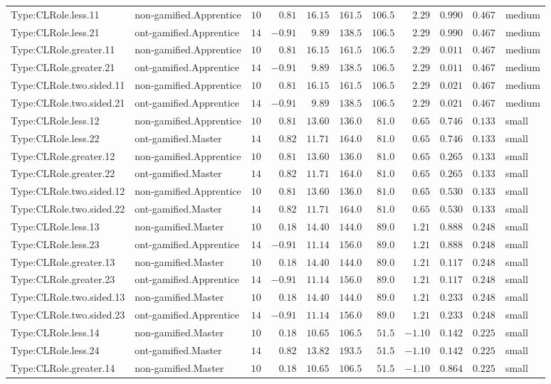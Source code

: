 \documentclass[6pt,a4paper]{article}
\begin{document}
{\begin{longtable}{llrrrrrrrrl}
Type:CLRole.less.11&non-gamified.Apprentice&$10$&$ 0.81$&$16.15$&$161.5$&$106.5$&$ 2.29$&$0.990$&$0.467$&medium\tabularnewline
Type:CLRole.less.21&ont-gamified.Apprentice&$14$&$-0.91$&$ 9.89$&$138.5$&$106.5$&$ 2.29$&$0.990$&$0.467$&medium\tabularnewline
Type:CLRole.greater.11&non-gamified.Apprentice&$10$&$ 0.81$&$16.15$&$161.5$&$106.5$&$ 2.29$&$0.011$&$0.467$&medium\tabularnewline
Type:CLRole.greater.21&ont-gamified.Apprentice&$14$&$-0.91$&$ 9.89$&$138.5$&$106.5$&$ 2.29$&$0.011$&$0.467$&medium\tabularnewline
Type:CLRole.two.sided.11&non-gamified.Apprentice&$10$&$ 0.81$&$16.15$&$161.5$&$106.5$&$ 2.29$&$0.021$&$0.467$&medium\tabularnewline
Type:CLRole.two.sided.21&ont-gamified.Apprentice&$14$&$-0.91$&$ 9.89$&$138.5$&$106.5$&$ 2.29$&$0.021$&$0.467$&medium\tabularnewline
Type:CLRole.less.12&non-gamified.Apprentice&$10$&$ 0.81$&$13.60$&$136.0$&$ 81.0$&$ 0.65$&$0.746$&$0.133$&small\tabularnewline
Type:CLRole.less.22&ont-gamified.Master&$14$&$ 0.82$&$11.71$&$164.0$&$ 81.0$&$ 0.65$&$0.746$&$0.133$&small\tabularnewline
Type:CLRole.greater.12&non-gamified.Apprentice&$10$&$ 0.81$&$13.60$&$136.0$&$ 81.0$&$ 0.65$&$0.265$&$0.133$&small\tabularnewline
Type:CLRole.greater.22&ont-gamified.Master&$14$&$ 0.82$&$11.71$&$164.0$&$ 81.0$&$ 0.65$&$0.265$&$0.133$&small\tabularnewline
Type:CLRole.two.sided.12&non-gamified.Apprentice&$10$&$ 0.81$&$13.60$&$136.0$&$ 81.0$&$ 0.65$&$0.530$&$0.133$&small\tabularnewline
Type:CLRole.two.sided.22&ont-gamified.Master&$14$&$ 0.82$&$11.71$&$164.0$&$ 81.0$&$ 0.65$&$0.530$&$0.133$&small\tabularnewline
Type:CLRole.less.13&non-gamified.Master&$10$&$ 0.18$&$14.40$&$144.0$&$ 89.0$&$ 1.21$&$0.888$&$0.248$&small\tabularnewline
Type:CLRole.less.23&ont-gamified.Apprentice&$14$&$-0.91$&$11.14$&$156.0$&$ 89.0$&$ 1.21$&$0.888$&$0.248$&small\tabularnewline
Type:CLRole.greater.13&non-gamified.Master&$10$&$ 0.18$&$14.40$&$144.0$&$ 89.0$&$ 1.21$&$0.117$&$0.248$&small\tabularnewline
Type:CLRole.greater.23&ont-gamified.Apprentice&$14$&$-0.91$&$11.14$&$156.0$&$ 89.0$&$ 1.21$&$0.117$&$0.248$&small\tabularnewline
Type:CLRole.two.sided.13&non-gamified.Master&$10$&$ 0.18$&$14.40$&$144.0$&$ 89.0$&$ 1.21$&$0.233$&$0.248$&small\tabularnewline
Type:CLRole.two.sided.23&ont-gamified.Apprentice&$14$&$-0.91$&$11.14$&$156.0$&$ 89.0$&$ 1.21$&$0.233$&$0.248$&small\tabularnewline
Type:CLRole.less.14&non-gamified.Master&$10$&$ 0.18$&$10.65$&$106.5$&$ 51.5$&$-1.10$&$0.142$&$0.225$&small\tabularnewline
Type:CLRole.less.24&ont-gamified.Master&$14$&$ 0.82$&$13.82$&$193.5$&$ 51.5$&$-1.10$&$0.142$&$0.225$&small\tabularnewline
Type:CLRole.greater.14&non-gamified.Master&$10$&$ 0.18$&$10.65$&$106.5$&$ 51.5$&$-1.10$&$0.864$&$0.225$&small\tabularnewline

\end{longtable}}
\end{document}
